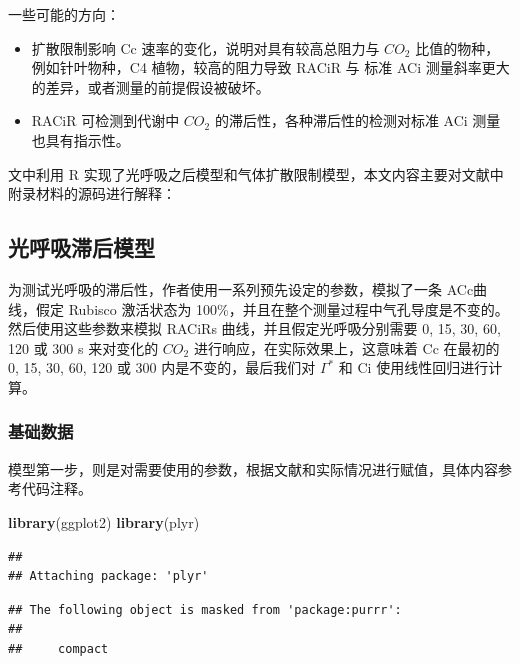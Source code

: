 \documentclass[
]{krantz}
\makeatletter
\newenvironment{Shaded}{\begin{snugshade}}{\end{snugshade}}
\newcommand{\KeywordTok}[1]{\textcolor[rgb]{0.13,0.29,0.53}{\textbf{#1}}}
\newcommand{\NormalTok}[1]{#1}
\newenvironment{kframe}{%
\medskip{}
\setlength{\fboxsep}{.8em}
 \def\at@end@of@kframe{}%
 \ifinner\ifhmode%
  \def\at@end@of@kframe{\end{minipage}}%
  \begin{minipage}{\columnwidth}%
 \fi\fi%
 \def\FrameCommand##1{\hskip\@totalleftmargin \hskip-\fboxsep
 \colorbox{shadecolor}{##1}\hskip-\fboxsep
     \hskip-\linewidth \hskip-\@totalleftmargin \hskip\columnwidth}%
 \MakeFramed {\advance\hsize-\width
   \@totalleftmargin\z@ \linewidth\hsize
   \@setminipage}}%
 {\par\unskip\endMakeFramed%
 \at@end@of@kframe}
\renewenvironment{Shaded}{\begin{kframe}}{\end{kframe}}
\makeatother
\begin{document}
一些可能的方向：

\begin{itemize}
\item
  扩散限制影响 Cc 速率的变化，说明对具有较高总阻力与 \(CO_2\) 比值的物种，例如针叶物种，C4 植物，较高的阻力导致 RACiR 与 标准 ACi 测量斜率更大的差异，或者测量的前提假设被破坏。
\item
  RACiR 可检测到代谢中 \(CO_2\) 的滞后性，各种滞后性的检测对标准 ACi 测量也具有指示性。
\end{itemize}

文中利用 R 实现了光呼吸之后模型和气体扩散限制模型，本文内容主要对文献中附录材料的源码进行解释：

\hypertarget{photoresp-lag}{%
\subsection{光呼吸滞后模型}\label{photoresp-lag}}

为测试光呼吸的滞后性，作者使用一系列预先设定的参数，模拟了一条 ACc曲线，假定 Rubisco 激活状态为 100\%，并且在整个测量过程中气孔导度是不变的。然后使用这些参数来模拟 RACiRs 曲线，并且假定光呼吸分别需要 0, 15, 30, 60, 120 或 300 s 来对变化的 \(CO_2\) 进行响应，在实际效果上，这意味着 Cc 在最初的 0, 15, 30, 60, 120 或 300 内是不变的，最后我们对 \(\Gamma^*\) 和 Ci 使用线性回归进行计算。

\hypertarget{base-data}{%
\subsubsection{基础数据}\label{base-data}}

模型第一步，则是对需要使用的参数，根据文献和实际情况进行赋值，具体内容参考代码注释。

\begin{Shaded}
\begin{Highlighting}[]
\KeywordTok{library}\NormalTok{(ggplot2)}
\KeywordTok{library}\NormalTok{(plyr)}
\end{Highlighting}
\end{Shaded}

\begin{verbatim}
## 
## Attaching package: 'plyr'
\end{verbatim}

\begin{verbatim}
## The following object is masked from 'package:purrr':
## 
##     compact
\end{verbatim}
\end{document}
